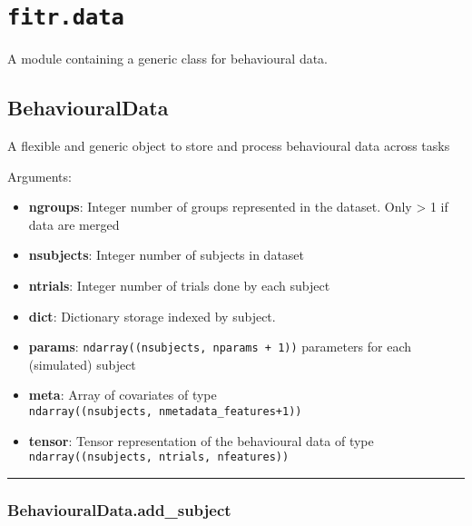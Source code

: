 \section{\texorpdfstring{\texttt{fitr.data}}{fitr.data}}\label{fitr.data}

A module containing a generic class for behavioural data.

\subsection{BehaviouralData}\label{behaviouraldata}

\begin{Shaded}
\begin{Highlighting}[]
\end{Highlighting}
\end{Shaded}

A flexible and generic object to store and process behavioural data
across tasks

Arguments:

\begin{itemize}
\tightlist
\item
  \textbf{ngroups}: Integer number of groups represented in the dataset.
  Only \textgreater{} 1 if data are merged
\item
  \textbf{nsubjects}: Integer number of subjects in dataset
\item
  \textbf{ntrials}: Integer number of trials done by each subject
\item
  \textbf{dict}: Dictionary storage indexed by subject.
\item
  \textbf{params}: \texttt{ndarray((nsubjects,\ nparams\ +\ 1))}
  parameters for each (simulated) subject
\item
  \textbf{meta}: Array of covariates of type
  \texttt{ndarray((nsubjects,\ nmetadata\_features+1))}
\item
  \textbf{tensor}: Tensor representation of the behavioural data of type
  \texttt{ndarray((nsubjects,\ ntrials,\ nfeatures))}
\end{itemize}

\begin{center}\rule{0.5\linewidth}{\linethickness}\end{center}

\subsubsection{BehaviouralData.add\_subject}\label{behaviouraldata.add_subject}

